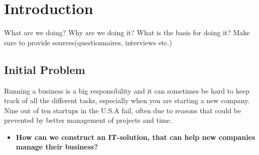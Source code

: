 \section{Introduction}
What are we doing?
Why are we doing it?
What is the basis for doing it?
Make sure to provide sources(questionnaires, interviews etc.)

\subsection{Initial Problem}
Running a business is a big responsibility and it can sometimes be hard to keep track of all the different tasks, especially when you are starting a new company. 
Nine out of ten startups in the U.S.A fail, often due to reasons that could be prevented by better management of projects and time\citep{fortune_start}.




\begin{itemize}
\item{\noindent\textbf{How can we construct an IT-solution, that can help new companies manage their business?}}
\end{itemize}

\newpage